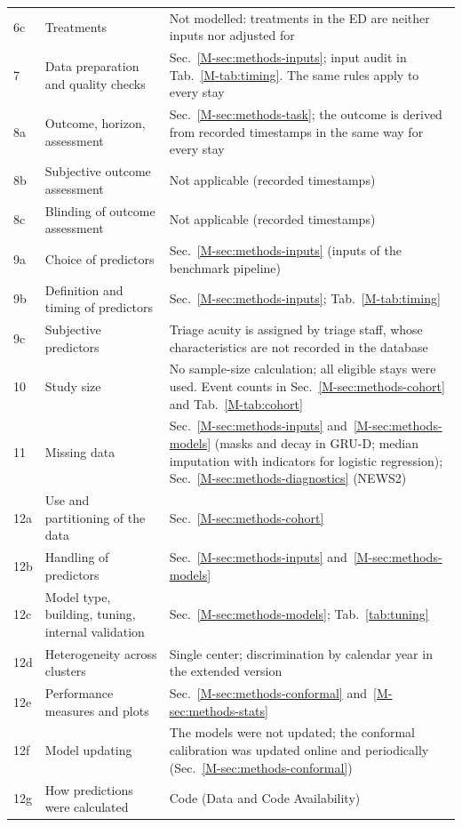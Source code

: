 {\begin{longtable}{@{}p{0.9cm}p{5.4cm}p{10.2cm}@{}}
6c & Treatments & Not modelled: treatments in the ED are neither inputs nor adjusted for \\
7 & Data preparation and quality checks & Sec.~\ref{M-sec:methods-inputs}; input audit in Tab.~\ref{M-tab:timing}. The same rules apply to every stay \\
8a & Outcome, horizon, assessment & Sec.~\ref{M-sec:methods-task}; the outcome is derived from recorded timestamps in the same way for every stay \\
8b & Subjective outcome assessment & Not applicable (recorded timestamps) \\
8c & Blinding of outcome assessment & Not applicable (recorded timestamps) \\
9a & Choice of predictors & Sec.~\ref{M-sec:methods-inputs} (inputs of the benchmark pipeline) \\
9b & Definition and timing of predictors & Sec.~\ref{M-sec:methods-inputs}; Tab.~\ref{M-tab:timing} \\
9c & Subjective predictors & Triage acuity is assigned by triage staff, whose characteristics are not recorded in the database \\
10 & Study size & No sample-size calculation; all eligible stays were used. Event counts in Sec.~\ref{M-sec:methods-cohort} and Tab.~\ref{M-tab:cohort} \\
11 & Missing data & Sec.~\ref{M-sec:methods-inputs} and~\ref{M-sec:methods-models} (masks and decay in GRU-D; median imputation with indicators for logistic regression); Sec.~\ref{M-sec:methods-diagnostics} (NEWS2) \\
12a & Use and partitioning of the data & Sec.~\ref{M-sec:methods-cohort} \\
12b & Handling of predictors & Sec.~\ref{M-sec:methods-inputs} and~\ref{M-sec:methods-models} \\
12c & Model type, building, tuning, internal validation & Sec.~\ref{M-sec:methods-models}; Tab.~\ref{tab:tuning} \\
12d & Heterogeneity across clusters & Single center; discrimination by calendar year in the extended version \\
12e & Performance measures and plots & Sec.~\ref{M-sec:methods-conformal} and~\ref{M-sec:methods-stats} \\
12f & Model updating & The models were not updated; the conformal calibration was updated online and periodically (Sec.~\ref{M-sec:methods-conformal}) \\
12g & How predictions were calculated & Code (Data and Code Availability) \\

\end{longtable}}
